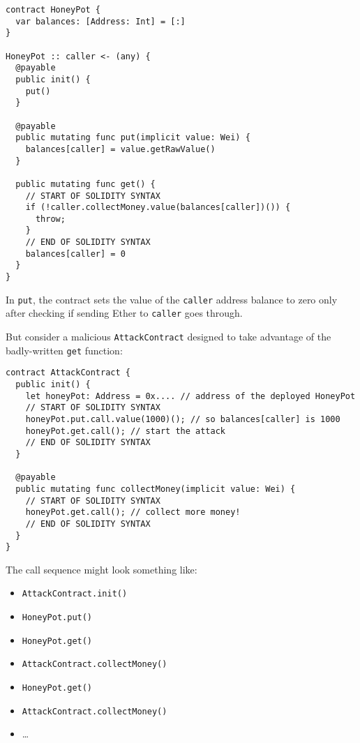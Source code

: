 \begin{verbatim}
contract HoneyPot {
  var balances: [Address: Int] = [:]
}

HoneyPot :: caller <- (any) {
  @payable
  public init() {
    put()
  }

  @payable
  public mutating func put(implicit value: Wei) {
    balances[caller] = value.getRawValue()
  }

  public mutating func get() {
    // START OF SOLIDITY SYNTAX
    if (!caller.collectMoney.value(balances[caller])()) {
      throw;
    }
    // END OF SOLIDITY SYNTAX
    balances[caller] = 0
  }
}
\end{verbatim}

In \texttt{put}, the contract sets the value of the \texttt{caller} address balance to zero only after checking if sending Ether to \texttt{caller} goes through.

But consider a malicious \texttt{AttackContract} designed to take advantage of the badly-written \texttt{get} function:

\begin{verbatim}
contract AttackContract {
  public init() {
    let honeyPot: Address = 0x.... // address of the deployed HoneyPot
    // START OF SOLIDITY SYNTAX
    honeyPot.put.call.value(1000)(); // so balances[caller] is 1000
    honeyPot.get.call(); // start the attack
    // END OF SOLIDITY SYNTAX
  }

  @payable
  public mutating func collectMoney(implicit value: Wei) {
    // START OF SOLIDITY SYNTAX
    honeyPot.get.call(); // collect more money!
    // END OF SOLIDITY SYNTAX
  }
}
\end{verbatim}

The call sequence might look something like:

\begin{itemize}
	\item \texttt{AttackContract.init()}
	\item \texttt{HoneyPot.put()}
	\item \texttt{HoneyPot.get()}
	\item \texttt{AttackContract.collectMoney()}
	\item \texttt{HoneyPot.get()}
	\item \texttt{AttackContract.collectMoney()}
	\item \dots
\end{itemize}

